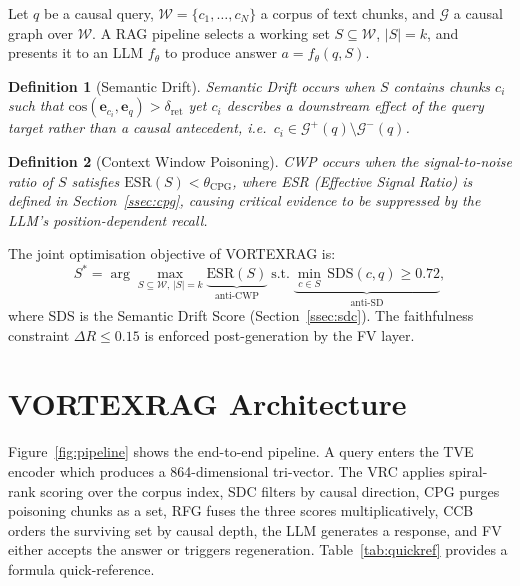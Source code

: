 \documentclass[10pt,twocolumn]{article}
\newtheorem{definition}{Definition}
\newcommand{\secvspace}{\vspace{-4pt}}
\begin{document}
Let $q$ be a causal query, $\mathcal{W} = \{c_1, \ldots, c_N\}$ a corpus of
text chunks, and $\mathcal{G}$ a causal graph over $\mathcal{W}$.  A RAG
pipeline selects a working set $S \subseteq \mathcal{W}$, $|S|=k$, and
presents it to an LLM $f_\theta$ to produce answer $a = f_\theta(q, S)$.

\begin{definition}[Semantic Drift]
  Semantic Drift occurs when $S$ contains chunks $c_i$ such that
  $\mathrm{cos}(\mathbf{e}_{c_i}, \mathbf{e}_q) > \delta_{\mathrm{ret}}$ yet
  $c_i$ describes a \emph{downstream effect} of the query target rather than a
  causal antecedent, i.e.\ $c_i \in \mathcal{G}^+(q) \setminus \mathcal{G}^-(q)$.
\end{definition}

\begin{definition}[Context Window Poisoning]
  CWP occurs when the signal-to-noise ratio of $S$ satisfies
  $\mathrm{ESR}(S) < \theta_{\mathrm{CPG}}$, where ESR (Effective
  Signal Ratio) is defined in Section~\ref{ssec:cpg}, causing critical
  evidence to be suppressed by the LLM's position-dependent recall.
\end{definition}

The joint optimisation objective of VORTEXRAG is:
\begin{equation}\label{eq:objective}
  S^* = \arg\max_{S \subseteq \mathcal{W},\,|S|=k}
        \underbrace{\mathrm{ESR}(S)}_{\text{anti-CWP}}
        \;\text{s.t.}\;
        \underbrace{\min_{c \in S}\, \mathrm{SDS}(c,q) \geq 0.72}_{\text{anti-SD}},
\end{equation}
where SDS is the Semantic Drift Score (Section~\ref{ssec:sdc}).  The
faithfulness constraint $\Delta R \leq 0.15$ is enforced post-generation
by the FV layer.

\section{VORTEXRAG Architecture}\label{sec:arch}
\secvspace

Figure~\ref{fig:pipeline} shows the end-to-end pipeline.  A query enters the
TVE encoder which produces a 864-dimensional tri-vector.  The VRC applies
spiral-rank scoring over the corpus index, SDC filters by causal direction,
CPG purges poisoning chunks as a set, RFG fuses the three scores
multiplicatively, CCB orders the surviving set by causal depth, the LLM
generates a response, and FV either accepts the answer or triggers
regeneration.  Table~\ref{tab:quickref} provides a formula quick-reference.
\end{document}
